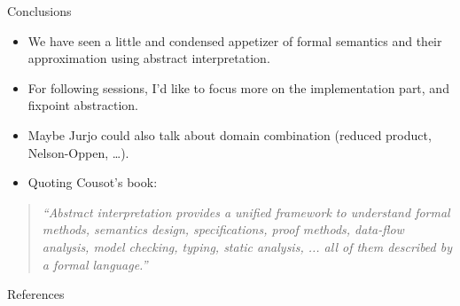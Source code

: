 \documentclass[aspectratio=169]{beamer}
\begin{document}
\begin{frame}{Conclusions}
  \begin{itemize}
  \item We have seen a little and condensed appetizer of formal
    semantics and their approximation using abstract interpretation.
  \item For following sessions, I'd like to focus more on the implementation part, and fixpoint abstraction.
  \item Maybe Jurjo could also talk about domain combination (reduced product, Nelson-Oppen, \ldots).
  \item Quoting Cousot's book:
  \end{itemize}
  \begin{quote}\itshape
    ``Abstract interpretation provides a unified framework to understand formal methods,
    semantics design, specifications, proof methods, data-flow analysis, model checking, typing, static analysis, ...  all of them described by a formal language.''
  \end{quote}
\end{frame}
%
\begin{frame}[plain]
  \titlepage
\end{frame}
%
\addtocounter{framenumber}{-1}
%
\begin{frame}[allowframebreaks]{References}
  \scriptsize
  
  
\end{frame}
%
\end{document}
